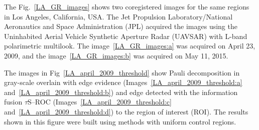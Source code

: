 \documentclass[remotesensing,article,submit,pdftex,moreauthors]{Definitions/mdpi}
\begin{document}
The Fig.~\eqref{LA_GR_images}  shows two coregistered images for the same regions in Los Angeles, California, USA. The Jet Propulsion Laboratory/National Aeronautics and Space Administration (JPL) acquired the images using  the Uninhabited Aerial Vehicle Synthetic Aperture Radar (UAVSAR) with L-band polarimetric multilook. The image~\eqref{LA_GR_images:a} was acquired on April 23, 2009, and the image~\eqref{LA_GR_images:b} was acquired on May 11, 2015. 

The images in Fig~\eqref{LA_april_2009_threshold} show Pauli decomposition in gray-scale overlain     
with edge evidence (Images~\eqref{LA_april_2009_threshold:a} and~\eqref{LA_april_2009_threshold:b}) and edge detected with the information fusion $\tau$S--ROC (Images~\eqref{LA_april_2009_threshold:c} and~\eqref{LA_april_2009_threshold:d}) to the region of interest (ROI). The results shown in this figure were built using methods with uniform control regions.
\end{document}
